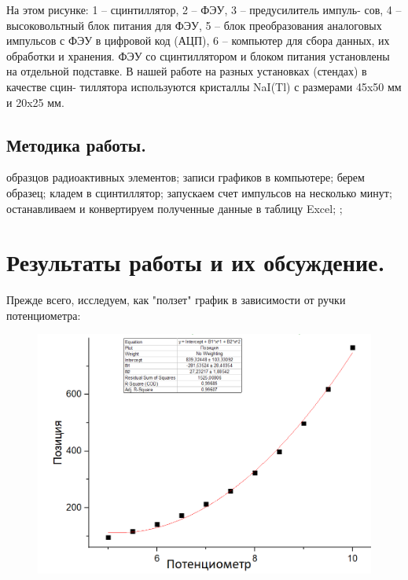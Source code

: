 \documentclass[%
 reprint,
 amsmath,amssymb,
 aps,
]{revtex4-2}
\begin{document}
На этом рисунке: 1 – сцинтиллятор, 2 – ФЭУ, 3 – предусилитель импуль-
сов,
4 – высоковольтный блок питания для ФЭУ, 5 – блок преобразования
аналоговых импульсов с ФЭУ в цифровой код (АЦП), 6 – компьютер для
сбора данных, их обработки и хранения.
ФЭУ со сцинтиллятором и блоком питания установлены на отдельной
подставке. В нашей работе на разных установках (стендах) в качестве сцин-
тиллятора используются кристаллы NaI(Tl) с размерами 45x50 мм и 
20x25 мм.
\subsection{Методика работы.}

\begin{algorithmic}[1]
	 образцов радиоактивных элементов;
	\ENSURE записи графиков в компьютере;
	\REPEAT
	\STATE берем образец;
	\STATE кладем в сцинтиллятор;
	\STATE запускаем счет импульсов на несколько минут;
	\STATE останавливаем и конвертируем полученные данные в таблицу Excel;
	;	
	\ENDFOR
\end{algorithmic}


\section{Результаты работы и их обсуждение.}

Прежде всего, исследуем, как "ползет" график в зависимости от ручки потенциометра:

\begin{figure}[h!]
	\includegraphics[scale=0.45]{2.png}
\end{figure}
\end{document}
